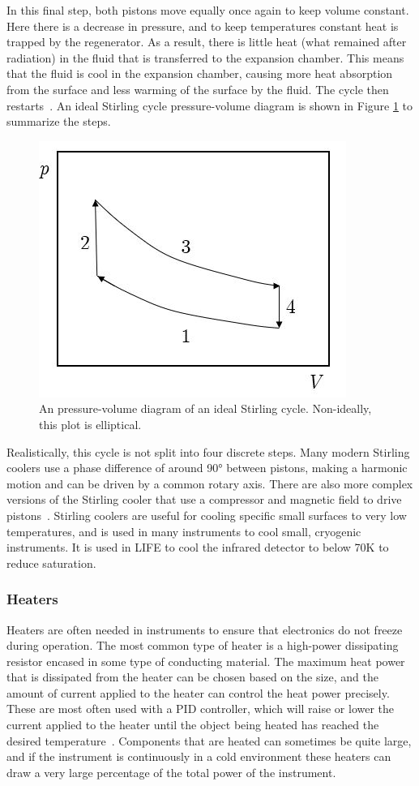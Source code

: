 In this final step, both pistons move equally once again to keep volume constant. Here there is a decrease in pressure, and to keep temperatures constant heat is trapped by the regenerator. As a result, there is little heat (what remained after radiation) in the fluid that is transferred to the expansion chamber. This means that the fluid is cool in the expansion chamber, causing more heat absorption from the surface and less warming of the surface by the fluid. The cycle then restarts~\citep{cryocoolers}. An ideal Stirling cycle pressure-volume diagram is shown in Figure \ref{fig:stirling_cycle} to summarize the steps.

\begin{figure}[h]
\centering
  \includegraphics[width=0.5\linewidth]{chap2_images/stirling_cycle.JPG}
  \caption{An pressure-volume diagram of an ideal Stirling cycle. Non-ideally, this plot is elliptical.}
  \label{fig:stirling_cycle}
\end{figure}

Realistically, this cycle is not split into four discrete steps. Many modern Stirling coolers use a phase difference of around 90° between pistons, making a harmonic motion and can be driven by a common rotary axis. There are also more complex versions of the Stirling cooler that use a compressor and magnetic field to drive pistons~\citep{cryocoolers}. Stirling coolers are useful for cooling specific small surfaces to very low temperatures, and is used in many instruments to cool small, cryogenic instruments. It is used in LIFE to cool the infrared detector to below 70K to reduce saturation.

\subsubsection{Heaters} %

Heaters are often needed in instruments to ensure that electronics do not freeze during operation. The most common type of heater is a high-power dissipating resistor encased in some type of conducting material. The maximum heat power that is dissipated from the heater can be chosen based on the size, and the amount of current applied to the heater can control the heat power precisely. These are most often used with a PID controller, which will raise or lower the current applied to the heater until the object being heated has reached the desired temperature~\citep{SMAD}. Components that are heated can sometimes be quite large, and if the instrument is continuously in a cold environment these heaters can draw a very large percentage of the total power of the instrument. 

